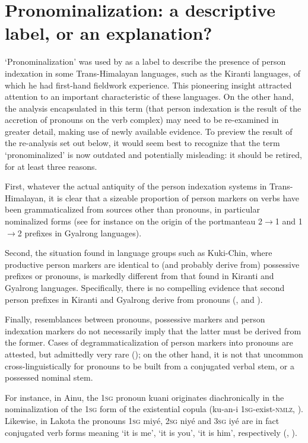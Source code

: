 \documentclass[oldfontcommands,oneside,a4paper,11pt]{article}
\newcommand{\ipa}[1]{{\phon \mbox{#1}}} %
\begin{document}
\section{Pronominalization: a descriptive label, or an explanation?}
`Pronominalization' was used by \citet{hodgson57sifan} as a label to describe the presence of person indexation in some Trans-Himalayan languages, such as the Kiranti languages, of which he had first-hand fieldwork experience. This pioneering insight attracted attention to an important characteristic of these languages. On the other hand, the analysis encapsulated in this term (that person indexation is the result of the accretion of pronouns on the verb complex) may need to be re-examined in greater detail, making use of newly available evidence. To preview the result of the re-analysis set out below, it would seem best to recognize that the term `pronominalized' is now outdated and potentially misleading: it should be retired, for at least three reasons.

First, whatever the actual antiquity of the person indexation systems in Trans-Himalayan, it is clear that a sizeable proportion of person markers on verbs have been grammaticalized from sources other than pronouns, in particular nominalized forms (see for instance \citealt{jacques15generic} on the origin of the portmanteau 2$\rightarrow$1 and 1$\rightarrow$2 prefixes in Gyalrong languages).

Second, the situation found in language groups such as Kuki-Chin, where productive person markers are identical to (and probably derive from) possessive prefixes or pronouns, is markedly different from that found in Kiranti and Gyalrong languages. Specifically, there is no compelling evidence that second person prefixes in Kiranti and Gyalrong derive from pronouns (\citealt{jacques12agreement}, \citealt{delancey11prefixes} and \citealt{delancey14second}).

Finally, resemblances between pronouns, possessive markers and person indexation markers do not necessarily imply that the latter must be derived from the former. Cases of degrammaticalization of person markers into pronouns are attested, but admittedly very rare (\citealt{norde09degrammaticalization, hyman11macrosudan}); on the other hand, it is not that uncommon cross-linguistically for pronouns to be built from a conjugated verbal stem, or a possessed nominal stem. 

For instance, in Ainu, the \textsc{1sg} pronoun \ipa{kuani} originates diachronically in the nominalization of the \textsc{1sg} form of the existential copula (\ipa{ku-an-i} \textsc{1sg}-exist-\textsc{nmlz}, \citealt[31]{shibatani90japan}). Likewise, in Lakota the pronouns \textsc{1sg} \ipa{miyé}, \textsc{2sg} \ipa{niyé} and \textsc{3sg} \ipa{iyé} are in fact conjugated verb forms meaning `it is me', `it is you', `it is him', respectively (\citealt{deloria41}, \citealt[707;754]{ullrich08}). 
\end{document}
